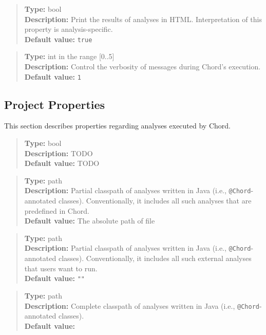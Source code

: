 \begin{quote}
{\bf Type:} bool \\
{\bf Description:} Print the results of analyses in HTML.  Interpretation of this property is analysis-specific.  \\
{\bf Default value:} {\tt true}
\end{quote}

\begin{quote}
{\bf Type:} int in the range [0..5]  \\
{\bf Description:} Control the verbosity of messages during Chord's execution.  \\
{\bf Default value:} {\tt 1}
\end{quote}

\subsection{Project Properties}
\label{sec:project-props}

This section describes properties regarding analyses executed by Chord.
\\[10pt]

\begin{quote}
{\bf Type:} bool \\
{\bf Description:} TODO \\
{\bf Default value:} TODO
\end{quote}

\begin{quote}
{\bf Type:} path \\
{\bf Description:} Partial classpath of analyses written in Java (i.e., {\tt @Chord}-annotated classes).
Conventionally, it includes all such analyses that are predefined in Chord.  \\
{\bf Default value:} The absolute path of file 
\end{quote}

\begin{quote}
{\bf Type:} path \\
{\bf Description:} Partial classpath of analyses written in Java (i.e., {\tt @Chord}-annotated classes).
Conventionally, it includes all such external analyses that users want to run. \\
{\bf Default value:} {\tt ""}
\end{quote}

\begin{quote}
{\bf Type:} path \\
{\bf Description:} Complete classpath of analyses written in Java (i.e., {\tt @Chord}-annotated classes). \\
{\bf Default value:} 
\end{quote}

